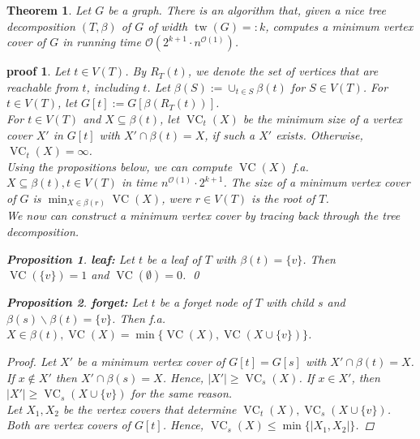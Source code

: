 \documentclass[11pt,a4paper]{article}
\newtheorem*{theorem}{Theorem}
\newtheorem*{proposition}{Proposition}
\newtheorem*{proof_}{proof}
\DeclareMathOperator{\tw}{tw}
\DeclareMathOperator{\VC}{VC}
\begin{document}
\begin{theorem}
Let $G$ be a graph. There is an algorithm that, given a nice tree decomposition $(T, \beta)$ of $G$ of width $\tw(G) =: k$, computes a minimum vertex cover of $G$ in running time $\mathcal{O}(2^{k+1} \cdot n^{\mathcal{O}(1)})$.
\end{theorem}

\begin{proof_}
Let $t \in V(T)$. By $R_{T}(t)$, we denote the set of vertices that are reachable from $t$, including $t$. Let $\beta(S) := \cup_{t \in S} \beta(t)$ for $S \in V(T)$. For $t \in V(T)$, let $G[t] := G[\beta(R_{T}(t))]$. \\

For $t \in V(T)$ and $X \subseteq \beta(t)$, let $\VC_{t}(X)$ be the minimum size of a vertex cover $X'$ in $G[t]$ with $X' \cap \beta(t) = X$, if such a $X'$ exists. Otherwise, $\VC_{t}(X) = \infty$. \\

Using the propositions below, we can compute $\VC(X)$ f.a. $X \subseteq \beta(t), t \in V(T)$ in time $n^{\mathcal{O}(1)} \cdot 2^{k+1}$. The size of a minimum vertex cover of $G$ is $\min_{X \in \beta(r)} \VC(X)$, were $r \in V(T)$ is the root of $T$. \\
We now can construct a minimum vertex cover by tracing back through the tree decomposition.

\begin{proposition}
\textbf{leaf:} Let $t$ be a leaf of $T$ with $\beta(t) = \{v\}$. Then $\VC(\{v\}) = 1$ and $\VC(\emptyset) = 0$. \qed
\end{proposition}

\begin{proposition}
\textbf{forget:} Let $t$ be a forget node of $T$ with child $s$ and $\beta(s) \backslash \beta(t) = \{v\}$. Then f.a. $X \in \beta(t), \VC(X) = \min \{\VC(X), \VC(X \cup \{v\})\}$.
\end{proposition}

\begin{proof}
Let $X'$ be a minimum vertex cover of $G[t] = G[s]$ with $X' \cap \beta(t) = X$. If $x \not \in X'$ then $X' \cap \beta(s) = X$. Hence, $|X'| \geq \VC_{s}(X)$. If $x \in X'$, then $|X'| \geq \VC_{s}(X \cup \{v\})$ for the same reason. \\
Let $X_{1}, X_{2}$ be the vertex covers that determine $\VC_{t}(X),  \VC_{s}(X \cup \{v\})$. Both are vertex covers of $G[t]$. Hence, $\VC_{s}(X) \leq \min \{|X_{1}, X_{2}| \}$.
\end{proof}



\end{proof_}
\end{document}
